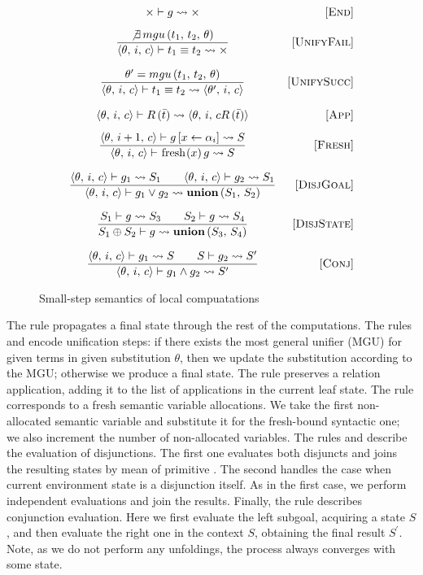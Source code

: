 \begin{figure}[t]
\[\begin{array}{cr}
{\times \vdash g \leadsto \times}
&     \ruleno{End} \\[3mm]
\dfrac{\not\exists \, mgu\,(t_1,\, t_2,\, \theta)}
      {\inbr{\theta,\, i,\, c} \vdash t_1 \equiv t_2 \leadsto \times}
&     \ruleno{UnifyFail}  \\[6mm]
\dfrac{\theta^\prime = mgu\,(t_1,\, t_2,\, \theta)}
      {\inbr{\theta,\, i,\, c} \vdash t_1 \equiv t_2 \leadsto \inbr{\theta^\prime,\, i,\, c}}
&     \ruleno{UnifySucc}  \\[6mm]
      {\inbr{\theta,\, i,\, c} \vdash R\,(\bar{t}) \leadsto \inbr{\theta,\, i,\,cR\,(\bar{t})}}
&     \ruleno{App} \\[3mm]
\dfrac{\inbr{\theta,\, i+1,\, c} \vdash g\,[x \leftarrow \alpha_i] \leadsto S}
      {\inbr{\theta,\, i,\, c} \vdash \mbox{\lstinline|fresh|} (x)\, g \leadsto S}
&     \ruleno{Fresh}  \\[6mm]
\dfrac{\inbr{\theta,\, i,\, c} \vdash g_1 \leadsto S_1 \qquad \inbr{\theta,\, i,\, c} \vdash g_2 \leadsto S_1}
      {\inbr{\theta,\, i,\, c} \vdash g_1 \lor g_2 \leadsto \primi{union}\,(S_1,\, S_2)}
&     \ruleno{DisjGoal}  \\[6mm]
\dfrac{S_1 \vdash g \leadsto S_3 \qquad S_2 \vdash g \leadsto S_4}
      {S_1 \oplus S_2 \vdash g \leadsto \primi{union}\,(S_3,\, S_4)}
&     \ruleno{DisjState}  \\[6mm]
\dfrac{\inbr{\theta,\, i,\, c} \vdash g_1 \leadsto S \qquad S \vdash g_2 \leadsto S^\prime}
      {\inbr{\theta,\, i,\, c} \vdash g_1 \land g_2 \leadsto S^\prime}
&     \ruleno{Conj}
\end{array}\]
\caption{Small-step semantics of local compuatations}
\label{fair:unfolding-semantics}
\end{figure}

The rule  propagates a final state through the rest of the computations. The rules  and  encode unification steps: if there exists the most general
unifier (MGU) for given terms in given substitution $\theta$, then we update the substitution according to the MGU; otherwise we produce a final state. The rule  preserves a relation
application, adding it to the list of applications in the current leaf state. The rule  corresponds to a fresh semantic variable allocations. We take the first non-allocated semantic
variable and substitute it for the fresh-bound syntactic one; we also increment the number of non-allocated variables. The rules  and  describe the evaluation
of disjunctions. The first one evaluates both disjuncts and joins the resulting states by mean of primitive . The second handles the case when current environment state is a disjunction
itself. As in the first case, we perform independent evaluations and join the results. Finally, the rule  describes conjunction evaluation. Here we first evaluate the left subgoal,
acquiring a state $S$, and then evaluate the right one in the context $S$, obtaining the final result $S^\prime$. Note, as we do not perform any unfoldings, the process always converges with
some state.

